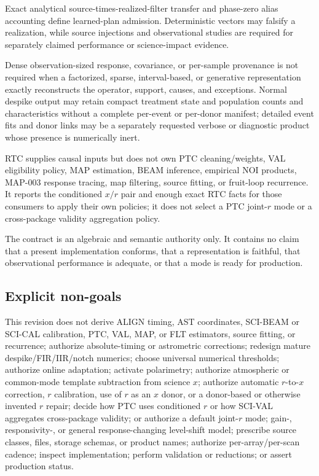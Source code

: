 \begin{description}[style=nextline,leftmargin=1em,labelindent=0pt,
  labelwidth=0pt,labelsep=0pt]
\item[SCI-RTC-ASM-009 -- Analytical authority.]
Exact analytical source-times-realized-filter transfer and phase-zero alias
accounting define learned-plan admission.  Deterministic vectors may falsify
a realization, while source injections and observational studies are required
for separately claimed performance or science-impact evidence.

\item[SCI-RTC-ASM-010 -- Compact representation.]
Dense observation-sized response, covariance, or per-sample provenance is not
required when a factorized, sparse, interval-based, or generative
representation exactly reconstructs the operator, support, causes, and
exceptions.  Normal despike output may retain compact treatment state and
population counts and characteristics without a complete per-event or
per-donor manifest; detailed event fits and donor links may be a separately
requested verbose or diagnostic product whose presence is numerically inert.

\item[SCI-RTC-ASM-011 -- Downstream authority.]
RTC supplies causal inputs but does not own PTC cleaning/weights, VAL
eligibility policy, MAP estimation, BEAM inference, empirical NOI products,
MAP-003 response tracing, map filtering, source fitting, or fruit-loop
recurrence.  It reports the conditioned $x/r$ pair and enough exact RTC facts
for those consumers to apply their own policies; it does not select a PTC
joint-$r$ mode or a cross-package validity aggregation policy.

\item[SCI-RTC-ASM-012 -- Claim separation.]
The contract is an algebraic and semantic authority only.  It contains no
claim that a present implementation conforms, that a representation is
faithful, that observational performance is adequate, or that a mode is ready
for production.

\end{description}

\subsection{Explicit non-goals}

This revision does not derive ALIGN timing, AST coordinates, SCI-BEAM or
SCI-CAL calibration, PTC, VAL, MAP, or FLT estimators, source fitting, or recurrence;
authorize absolute-timing or astrometric corrections; redesign mature
despike/FIR/IIR/notch numerics; choose universal numerical thresholds;
authorize online adaptation; activate polarimetry; authorize atmospheric or
common-mode template subtraction from science $x$; authorize automatic
$r$-to-$x$ correction, $r$ calibration, use of $r$ as an $x$ donor, or a
donor-based or otherwise invented $r$ repair; decide how PTC uses conditioned
$r$ or how SCI-VAL aggregates cross-package validity; or authorize a default
joint-$r$ mode;
gain-, responsivity-, or general response-changing level-shift model;
prescribe source classes, files,
storage schemas, or product names; authorize per-array/per-scan cadence; inspect implementation;
perform validation or reductions; or assert production status.
